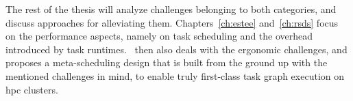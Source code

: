 The rest of the thesis will analyze challenges belonging to both categories, and discuss approaches
for alleviating them. Chapters~\ref{ch:estee} and~\ref{ch:rsds} focus on
the performance aspects, namely on task scheduling and the overhead introduced by task
runtimes.~ then also deals with the ergonomic challenges, and proposes a
meta-scheduling design that is built from the ground up with the mentioned challenges in mind,
to enable truly first-class task graph execution on \gls{hpc} clusters.
